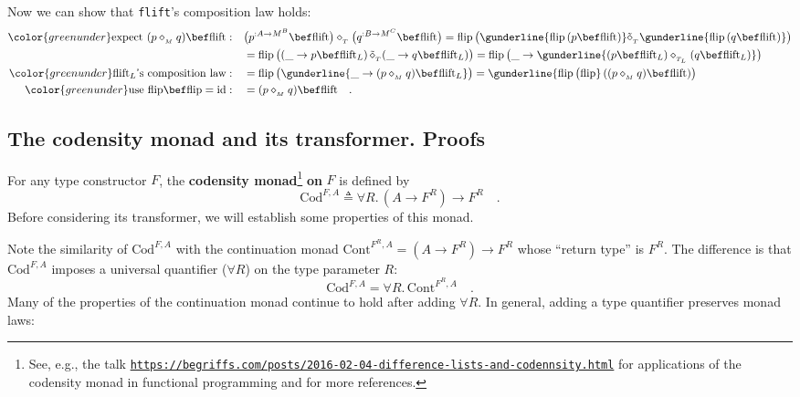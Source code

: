 Now we can show that \lstinline!flift!\textsf{'}s composition law holds:
\begin{align*}
{\color{greenunder}\text{expect }(p\diamond_{_{M}}q)\bef\text{flift}:}\quad & \big(p^{:A\rightarrow M^{B}}\bef\text{flift}\big)\diamond_{_{T}}\big(q^{:B\rightarrow M^{C}}\bef\text{flift}\big)=\text{flip}\,\big(\gunderline{\text{flip}\,(p\bef\text{flift})}\tilde{\diamond}_{_{T}}\gunderline{\text{flip}\,(q\bef\text{flift})}\big)\\
 & =\text{flip}\,\big((\_\rightarrow p\bef\text{flift}_{L})\,\tilde{\diamond}_{_{T}}(\_\rightarrow q\bef\text{flift}_{L})\big)=\text{flip}\,\big(\_\rightarrow\gunderline{(p\bef\text{flift}_{L})\diamond_{_{T_{L}}}(q\bef\text{flift}_{L})}\big)\\
{\color{greenunder}\text{flift}_{L}\text{\textsf{'}s composition law}:}\quad & =\text{flip}\,\big(\gunderline{\_\rightarrow(p\diamond_{_{M}}q)\bef\text{flift}_{L}}\big)=\gunderline{\text{flip}\,\big(\text{flip}}\,((p\diamond_{_{M}}q)\bef\text{flift})\big)\\
{\color{greenunder}\text{use }\text{flip}\bef\text{flip}=\text{id}:}\quad & =(p\diamond_{_{M}}q)\bef\text{flift}\quad.
\end{align*}


\subsection{The codensity monad and its transformer. Proofs\label{subsec:The-codensity-monad}}

For any type constructor $F$, the \textbf{codensity
monad}\footnote{See, e.g., the talk \texttt{\href{https://begriffs.com/posts/2016-02-04-difference-lists-and-codennsity.html}{https://begriffs.com/posts/2016-02-04-difference-lists-and-codennsity.html}}
for applications of the codensity monad in functional programming
and for more references.} \textbf{on} $F$ is defined by 
\[
\text{Cod}^{F,A}\triangleq\forall R.\,(A\rightarrow F^{R})\rightarrow F^{R}\quad.
\]
Before considering its transformer, we will establish some properties
of this monad.

Note the similarity of $\text{Cod}^{F,A}$ with the continuation monad
$\text{Cont}^{F^{R},A}=(A\rightarrow F^{R})\rightarrow F^{R}$ whose
\textsf{``}return type\textsf{''} is $F^{R}$. The difference is that $\text{Cod}^{F,A}$
imposes a universal quantifier ($\forall R$) on the type parameter
$R$:
\[
\text{Cod}^{F,A}=\forall R.\,\text{Cont}^{F^{R},A}\quad.
\]
 Many of the properties of the continuation monad continue to hold
after adding $\forall R$. In general, adding a type quantifier preserves
monad laws:


